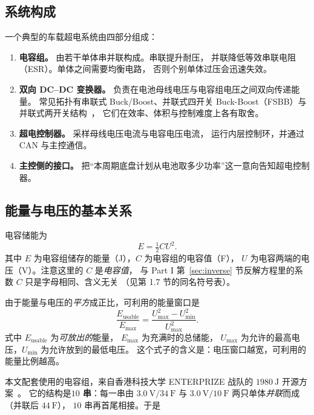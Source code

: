 \documentclass[cn,blue,11pt,device=normal]{elegantnote}
\begin{document}
\subsection{系统构成}

一个典型的车载超电系统由四部分组成：

\begin{enumerate}
  \item \textbf{电容组。} 由若干单体串并联构成。串联提升耐压，
  并联降低等效串联电阻（ESR）。单体之间需要均衡电路，
  否则个别单体过压会迅速失效。
  \item \textbf{双向 DC--DC 变换器。} 负责在电池母线电压与电容组电压之间双向传递能量。
  常见拓扑有串联式 Buck/Boost、并联式四开关 Buck-Boost（FSBB）与并联式两开关结构~\cite{adernal}，
  它们在效率、体积与控制难度上各有取舍。
  \item \textbf{超电控制器。} 采样母线电压电流与电容电压电流，
  运行内层控制环，并通过 CAN 与主控通信。
  \item \textbf{主控侧的接口。} 把“本周期底盘计划从电池取多少功率”这一意向告知超电控制器。
\end{enumerate}

\subsection{能量与电压的基本关系}

电容储能为
\begin{equation}\label{eq:capenergy}
  E = \tfrac{1}{2}CU^{2}.
\end{equation}
其中 $E$ 为电容组储存的能量（J），$C$ 为电容组的电容值（F），
$U$ 为电容两端的电压（V）。注意这里的 $C$ 是\emph{电容值}，
与 Part I 第~\ref{sec:inverse} 节反解方程里的系数 $C$ 只是字母相同、含义无关
（见第 1.7 节的同名符号表）。

由于能量与电压的\emph{平方}成正比，可利用的能量窗口是
\begin{equation}\label{eq:usable}
  \frac{E_{\mathrm{usable}}}{E_{\max}}
  = \frac{U_{\max}^{2} - U_{\min}^{2}}{U_{\max}^{2}} .
\end{equation}
式中 $E_{\mathrm{usable}}$ 为\emph{可放出的}能量，
$E_{\max}$ 为充满时的总储能，
$U_{\max}$ 为允许的最高电压，$U_{\min}$ 为允许放到的最低电压。
这个式子的含义是：电压窗口越宽，可利用的能量比例越高。

本文配套使用的电容组，来自香港科技大学 ENTERPRIZE 战队的
$1980\ \mathrm{J}$ 开源方案~\cite{hkust1980j}。
它的结构是\textbf{$10$ 串}：每一串由 $3.0\ \mathrm{V}/34\ \mathrm{F}$ 与
$3.0\ \mathrm{V}/10\ \mathrm{F}$ 两只单体\emph{并联}而成（并联后 $44\ \mathrm{F}$），
$10$ 串再首尾相接。于是
\end{document}
